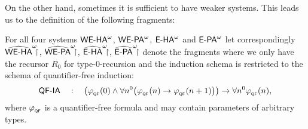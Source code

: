 %
%
On the other hand, sometimes it is sufficient to have weaker systems. 
This leads us to the definition of the following fragments:
\begin{dfn}
For all four systems $\weha$, $\wepa$, $\eha$ and $\epa$ let
correspondingly $\hrrweha$, $\hrrwepa$, $\hrreha$, $\hrrepa$ denote
the fragments where we only have the recursor $R_0$ for type-0-recursion and
the induction schema is restricted to the schema of
quantifier-free induction:
\[
\QF\m\IA\quad:\quad
             \left(\phi_{{}_{\QF}}(0)\wedge\forall n^0\big( \phi_{{}_{\QF}}(n)\rightarrow  \phi_{{}_{\QF}}(n+1)\big)\right)
             \rightarrow\forall n^0 \phi_{{}_{\QF}}(n)
\text{,}
\]
where $\phi_{{}_{\QF}}$ is a quantifier-free formula and may 
contain parameters of arbitrary types.
\end{dfn}

%
%
%
